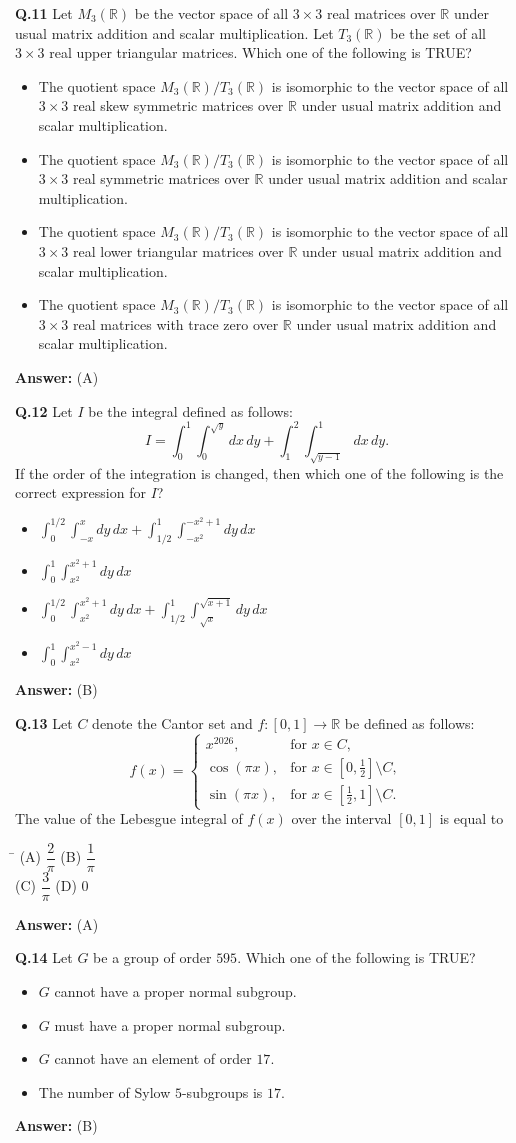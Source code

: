 \documentclass[11pt,a4paper]{article}
\newcommand{\optsfourA}[4]{%
  \begin{tabbing}
    \hspace{0.48\linewidth}\=\kill
    (A) #1 \> (B) #2 \\[2pt]
    (C) #3 \> (D) #4
  \end{tabbing}%
}
\newcommand{\optslistA}[4]{%
  \begin{itemize}
    \setlength{\itemsep}{2pt}\setlength{\parskip}{0pt}
    \item[(A)] #1
    \item[(B)] #2
    \item[(C)] #3
    \item[(D)] #4
  \end{itemize}%
}
\newcommand{\ans}[1]{\textbf{Answer:} #1\par\medskip}
\begin{document}
\textbf{Q.11} Let $M_3(\mathbb{R})$ be the vector space of all $3 \times 3$ real matrices over $\mathbb{R}$ under usual matrix addition and scalar multiplication. Let $T_3(\mathbb{R})$ be the set of all $3 \times 3$ real upper triangular matrices. Which one of the following is TRUE?
\optslistA{The quotient space $M_3(\mathbb{R})/T_3(\mathbb{R})$ is isomorphic to the vector space of all $3 \times 3$ real skew symmetric matrices over $\mathbb{R}$ under usual matrix addition and scalar multiplication.}{The quotient space $M_3(\mathbb{R})/T_3(\mathbb{R})$ is isomorphic to the vector space of all $3 \times 3$ real symmetric matrices over $\mathbb{R}$ under usual matrix addition and scalar multiplication.}{The quotient space $M_3(\mathbb{R})/T_3(\mathbb{R})$ is isomorphic to the vector space of all $3 \times 3$ real lower triangular matrices over $\mathbb{R}$ under usual matrix addition and scalar multiplication.}{The quotient space $M_3(\mathbb{R})/T_3(\mathbb{R})$ is isomorphic to the vector space of all $3 \times 3$ real matrices with trace zero over $\mathbb{R}$ under usual matrix addition and scalar multiplication.}
\ans{(A)}

\textbf{Q.12} Let $I$ be the integral defined as follows:
\[
  I = \int_0^1 \int_0^{\sqrt{y}} dx\,dy + \int_1^2 \int_{\sqrt{y-1}}^{1} dx\,dy.
\]
If the order of the integration is changed, then which one of the following is the correct expression for $I$?
\optslistA{$\displaystyle\int_0^{1/2} \int_{-x}^{x} dy\,dx + \int_{1/2}^{1} \int_{-x^2}^{-x^2+1} dy\,dx$}{$\displaystyle\int_0^1 \int_{x^2}^{x^2+1} dy\,dx$}{$\displaystyle\int_0^{1/2} \int_{x^2}^{x^2+1} dy\,dx + \int_{1/2}^{1} \int_{\sqrt{x}}^{\sqrt{x+1}} dy\,dx$}{$\displaystyle\int_0^1 \int_{x^2}^{x^2-1} dy\,dx$}
\ans{(B)}

\textbf{Q.13} Let $C$ denote the Cantor set and $f : [0, 1] \to \mathbb{R}$ be defined as follows:
\[
  f(x) = \begin{cases} x^{2026}, & \text{for } x \in C, \\ \cos(\pi x), & \text{for } x \in \left[0, \frac{1}{2}\right] \setminus C, \\ \sin(\pi x), & \text{for } x \in \left[\frac{1}{2}, 1\right] \setminus C. \end{cases}
\]
The value of the Lebesgue integral of $f(x)$ over the interval $[0, 1]$ is equal to
\optsfourA{$\dfrac{2}{\pi}$}{$\dfrac{1}{\pi}$}{$\dfrac{3}{\pi}$}{$0$}
\ans{(A)}

\textbf{Q.14} Let $G$ be a group of order $595$. Which one of the following is TRUE?
\optslistA{$G$ cannot have a proper normal subgroup.}{$G$ must have a proper normal subgroup.}{$G$ cannot have an element of order $17$.}{The number of Sylow $5$-subgroups is $17$.}
\ans{(B)}
\end{document}

